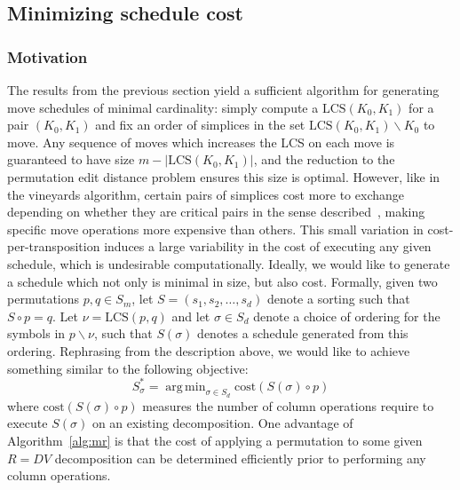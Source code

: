 \documentclass{siamart190516}
\DeclareMathOperator*{\argmin}{arg\,min}
\begin{document}
\subsection{Minimizing schedule cost}\label{sec:schedule_cost}
\subsubsection{Motivation}
The results from the previous section yield a sufficient algorithm for generating move schedules of minimal cardinality: simply compute a $\mathrm{LCS}(K_0, K_1)$ for a pair $(K_0, K_1)$ and fix an order of simplices in the set $\mathrm{LCS}(K_0, K_1) \smallsetminus K_0$ to move. Any sequence of moves which increases the LCS on each move is guaranteed to have size $m - \lvert \mathrm{LCS}(K_0, K_1) \rvert$, and the reduction to the permutation edit distance problem ensures this size is optimal. 
However, like in the vineyards algorithm, certain pairs of simplices cost more to exchange depending on whether they are critical pairs in the sense described~\cite{cohen2006vines}, making specific move operations more expensive than others. 
This small variation in cost-per-transposition induces a large variability in the cost of executing any given schedule, which is undesirable computationally. Ideally, we would like to generate a schedule which not only is minimal in size, but also cost. Formally, given two permutations $p, q \in S_m$, let $S = ( s_1, s_2, \dots, s_d )$ denote a sorting such that $S \circ p = q$. 
Let $\nu = \mathrm{LCS}(p,q)$ and let $\sigma \in S_d$ denote a choice of ordering for the symbols in  $p \smallsetminus \nu$, such that $S(\sigma)$ denotes a schedule generated from this ordering. Rephrasing from the description above, we would like to achieve something similar to the following objective: 
\begin{equation}\label{eq:schedule_opt}
	S_\sigma^\ast = \argmin_{\sigma \in S_d} \mathrm{cost}(S(\sigma) \circ p)
\end{equation}
where $\mathrm{cost}(S(\sigma) \circ p)$ measures the number of column operations require to execute $S(\sigma)$ on an existing decomposition. 
One advantage of Algorithm~\ref{alg:mr} is that the cost of applying a permutation to some given $R = D V$ decomposition can be determined efficiently prior to performing any column operations. 
\end{document}
